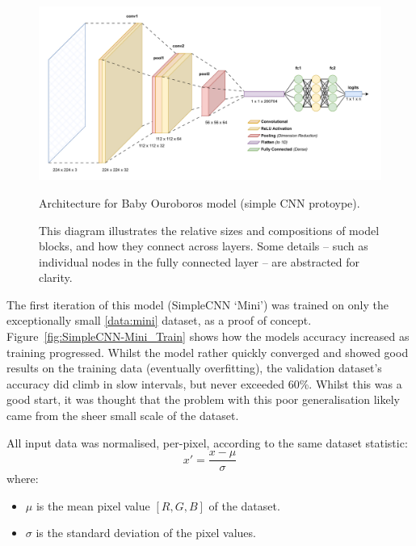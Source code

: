                 \begin{figure}[htbp]
                    \centering
                    \includegraphics[width=\linewidth]{images/BabyOuroboros.pdf}
                    \caption{Architecture for Baby Ouroboros model (simple CNN protoype).}
                    \caption*{This diagram illustrates the relative sizes and compositions of model blocks, and how they connect across layers. Some details -- such as individual nodes in the fully connected layer -- are abstracted for clarity.}
                    \label{fig:BabyOuroboros}
                \end{figure}
    
                The first iteration of this model (SimpleCNN `Mini') was trained on only the exceptionally small \ref{data:mini} dataset, as a proof of concept. Figure~\ref{fig:SimpleCNN-Mini_Train} shows how the models accuracy increased as training progressed. Whilst the model rather quickly converged and showed good results on the training data (eventually overfitting), the validation dataset's accuracy did climb in slow intervals, but never exceeded 60\%. Whilst this was a good start, it was thought that the problem with this poor generalisation likely came from the sheer small scale of the dataset.
    
                All input data was normalised, per-pixel, according to the same dataset statistic:
                    \[
                    x' = \frac{x - \mu}{\sigma}
                    \]
                where:
                    \begin{itemize}
                        \item \( \mu \) is the mean pixel value \([R,G,B]\) of the dataset.
                        \item \( \sigma \) is the standard deviation of the pixel values.
                    \end{itemize}
    
